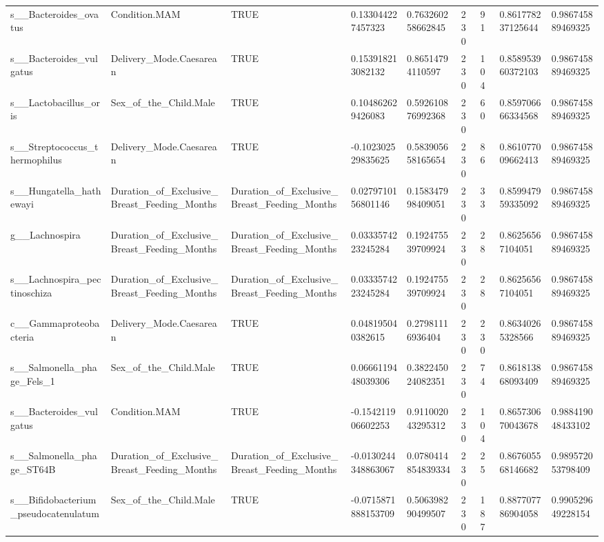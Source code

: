 \begin{longtable}{lllllllll}
s\_\_Bacteroides\_ovatus & Condition.MAM & TRUE & 0.133044227457323 & 0.763260258662845 & 230 & 91 & 0.861778237125644 & 0.986745889469325 \\
s\_\_Bacteroides\_vulgatus & Delivery\_Mode.Caesarean & TRUE & 0.153918213082132 & 0.86514794110597 & 230 & 104 & 0.858953960372103 & 0.986745889469325 \\
s\_\_Lactobacillus\_oris & Sex\_of\_the\_Child.Male & TRUE & 0.104862629426083 & 0.592610876992368 & 230 & 60 & 0.859706666334568 & 0.986745889469325 \\
s\_\_Streptococcus\_thermophilus & Delivery\_Mode.Caesarean & TRUE & -0.102302529835625 & 0.583905658165654 & 230 & 86 & 0.861077009662413 & 0.986745889469325 \\
s\_\_Hungatella\_hathewayi & Duration\_of\_Exclusive\_Breast\_Feeding\_Months & Duration\_of\_Exclusive\_Breast\_Feeding\_Months & 0.0279710156801146 & 0.158347998409051 & 230 & 33 & 0.859947959335092 & 0.986745889469325 \\
g\_\_Lachnospira & Duration\_of\_Exclusive\_Breast\_Feeding\_Months & Duration\_of\_Exclusive\_Breast\_Feeding\_Months & 0.0333574223245284 & 0.192475539709924 & 230 & 28 & 0.86256567104051 & 0.986745889469325 \\
s\_\_Lachnospira\_pectinoschiza & Duration\_of\_Exclusive\_Breast\_Feeding\_Months & Duration\_of\_Exclusive\_Breast\_Feeding\_Months & 0.0333574223245284 & 0.192475539709924 & 230 & 28 & 0.86256567104051 & 0.986745889469325 \\
c\_\_Gammaproteobacteria & Delivery\_Mode.Caesarean & TRUE & 0.048195040382615 & 0.27981116936404 & 230 & 230 & 0.86340265328566 & 0.986745889469325 \\
s\_\_Salmonella\_phage\_Fels\_1 & Sex\_of\_the\_Child.Male & TRUE & 0.0666119448039306 & 0.382245024082351 & 230 & 74 & 0.861813868093409 & 0.986745889469325 \\
s\_\_Bacteroides\_vulgatus & Condition.MAM & TRUE & -0.154211906602253 & 0.911002043295312 & 230 & 104 & 0.865730670043678 & 0.988419048433102 \\
s\_\_Salmonella\_phage\_ST64B & Duration\_of\_Exclusive\_Breast\_Feeding\_Months & Duration\_of\_Exclusive\_Breast\_Feeding\_Months & -0.0130244348863067 & 0.0780414854839334 & 230 & 25 & 0.867605568146682 & 0.989572053798409 \\
s\_\_Bifidobacterium\_pseudocatenulatum & Sex\_of\_the\_Child.Male & TRUE & -0.0715871888153709 & 0.506398290499507 & 230 & 187 & 0.887707786904058 & 0.990529649228154 \\

\end{longtable}
